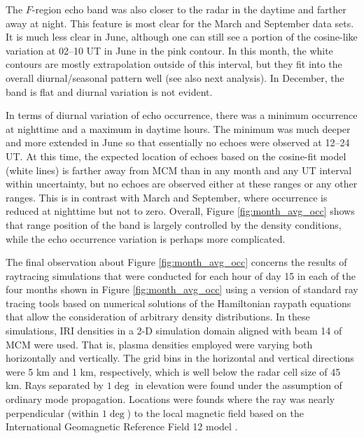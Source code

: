 The \(F\)-region echo band was also closer to the radar in the daytime and farther away at night. This feature is most clear for the March and September data sets. It is much less clear in June, although one can still see a portion of the cosine-like variation at 02--10 UT in June in the pink contour. In this month, the white contours are mostly extrapolation outside of this interval, but they fit into the overall diurnal/seasonal pattern well (see also next analysis).  In December, the band is flat and diurnal variation is not evident.

In terms of diurnal variation of echo occurrence, there was a minimum occurrence at nighttime and a maximum in daytime hours. The minimum was much deeper and more extended in June so that essentially no echoes were observed at 12--24 UT. At this time, the expected location of echoes based on the cosine-fit model (white lines) is farther away from MCM than in any month and any UT interval within uncertainty, but no echoes are observed either at these ranges or any other ranges. This is in contrast with March and September, where occurrence is reduced at nighttime but not to zero. Overall, Figure \ref{fig:month_avg_occ} shows that range position of the band is largely controlled by the density conditions, while the echo occurrence variation is perhaps more complicated.

The final observation about Figure \ref{fig:month_avg_occ} concerns the results of raytracing simulations that were conducted for each hour of day 15 in each of the four months shown in Figure \ref{fig:month_avg_occ} using a version of standard ray tracing tools based on numerical solutions of the Hamiltonian raypath equations \citep{Haselgrove1963,Jones1975} that allow the consideration of arbitrary density distributions. In these simulations, IRI densities in a 2-D simulation domain aligned with beam 14 of MCM were used.  That is, plasma densities employed were varying both horizontally and vertically.  The grid bins in the horizontal and vertical directions were 5 km and 1 km, respectively, which is well below the radar cell size of 45 km.  Rays separated by \(1\deg\) in elevation were found under the assumption of ordinary mode propagation.  Locations were founds where the ray was nearly perpendicular (within \(1\deg\)) to the local magnetic field based on the International Geomagnetic Reference Field 12 model \citep{Thebault2015}.

